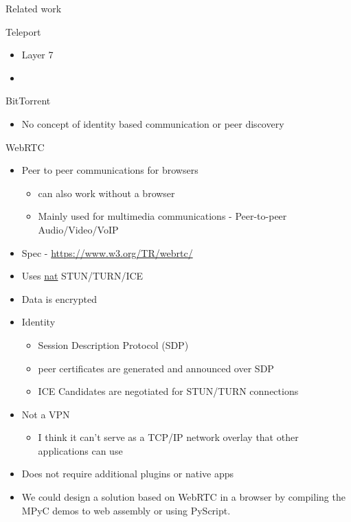 \begin{frame}[fragile]{Related work}
\begin{block}{Teleport}
\protect\hypertarget{teleport}{}
\begin{itemize}
\tightlist
\item
  Layer 7
\item
\end{itemize}
\end{block}

\begin{block}{BitTorrent}
\protect\hypertarget{bittorrent}{}
\begin{itemize}
\tightlist
\item
  No concept of identity based communication or peer discovery
\end{itemize}
\end{block}

\begin{block}{WebRTC}
\protect\hypertarget{webrtc}{}
\begin{itemize}
\tightlist
\item
  Peer to peer communications for browsers

  \begin{itemize}
  \tightlist
  \item
    can also work without a browser
  \item
    Mainly used for multimedia communications - Peer-to-peer
    Audio/Video/VoIP
  \end{itemize}
\item
  Spec -
  \href{https://www.w3.org/TR/webrtc/\#persistent-information-exposed-by-webrtc}{https://www.w3.org/TR/webrtc/}
\item
  Uses \href{notes/02021-internet-protocol.md}{nat} STUN/TURN/ICE
\item
  Data is encrypted
\item
  Identity

  \begin{itemize}
  \tightlist
  \item
    Session Description Protocol (SDP)
  \item
    peer certificates are generated and announced over SDP
  \item
    ICE Candidates are negotiated for STUN/TURN connections
  \end{itemize}
\item
  Not a VPN

  \begin{itemize}
  \tightlist
  \item
    I think it can't serve as a TCP/IP network overlay that other
    applications can use
  \end{itemize}
\item
  Does not require additional plugins or native apps
\item
  We could design a solution based on WebRTC in a browser by compiling
  the MPyC demos to web assembly or using PyScript.


\end{itemize}
\end{block}
\end{frame}

